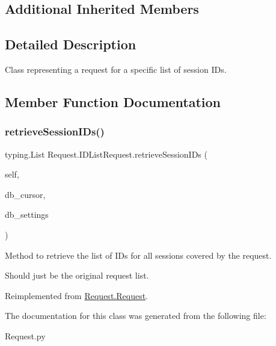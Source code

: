 \subsection*{Additional Inherited Members}


\subsection{Detailed Description}
Class representing a request for a specific list of session I\+Ds. 



\subsection{Member Function Documentation}
\mbox{\label{class_request_1_1_i_d_list_request_a444c98ee565920afcd145fb9081f0eb1}} 
\subsubsection{\texorpdfstring{retrieveSessionIDs()}{retrieveSessionIDs()}}
{\footnotesize\ttfamily  typing.\+List Request.\+I\+D\+List\+Request.\+retrieve\+Session\+I\+Ds (\begin{DoxyParamCaption}\item[{}]{self,  }\item[{}]{db\+\_\+cursor,  }\item[{}]{db\+\_\+settings }\end{DoxyParamCaption})}



Method to retrieve the list of I\+Ds for all sessions covered by the request. 

Should just be the original request list. 

Reimplemented from \mbox{\hyperlink{class_request_1_1_request_aa65df0d73c5d2524053dbedd666c7d9e}{Request.\+Request}}.



The documentation for this class was generated from the following file\+:\begin{DoxyCompactItemize}
\item 
Request.\+py\end{DoxyCompactItemize}
